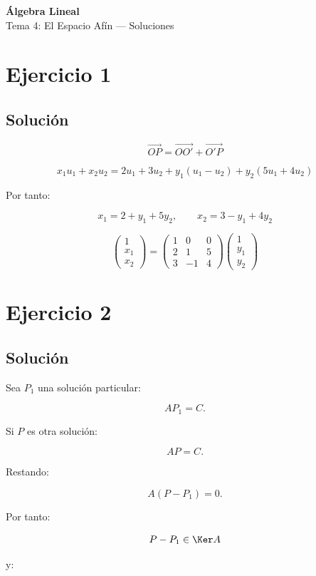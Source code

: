 \documentclass[11pt,a4paper]{article}
\begin{document}
\begin{center}
{\LARGE\bfseries Álgebra Lineal}\\[0.4em]
{\Large Tema 4: El Espacio Afín --- Soluciones}
\end{center}

\section{Ejercicio 1}
\subsection{Solución}

\[
\overrightarrow{OP}
=
\overrightarrow{OO'}+\overrightarrow{O'P}
\]

\[
x_1u_1+x_2u_2
=
2u_1+3u_2+y_1(u_1-u_2)+y_2(5u_1+4u_2)
\]

Por tanto:

\[
\boxed{
x_1=2+y_1+5y_2,
\qquad
x_2=3-y_1+4y_2
}
\]

\[
\boxed{
\begin{pmatrix}
1\\x_1\\x_2
\end{pmatrix}
=
\begin{pmatrix}
1&0&0\\
2&1&5\\
3&-1&4
\end{pmatrix}
\begin{pmatrix}
1\\y_1\\y_2
\end{pmatrix}
}
\]

\section{Ejercicio 2}
\subsection{Solución}

Sea $P_1$ una solución particular:

\[
AP_1=C.
\]

Si $P$ es otra solución:

\[
AP=C.
\]

Restando:

\[
A(P-P_1)=0.
\]

Por tanto:

\[
P-P_1\in\Ker A
\]

y:
\end{document}
